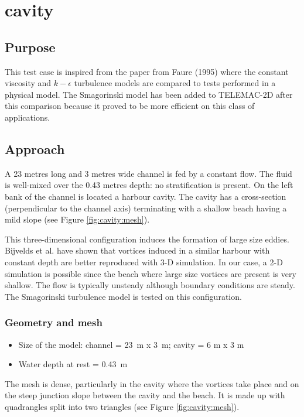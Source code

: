 \chapter{cavity}

\section{Purpose}
This test case is inspired from the paper from Faure (1995)
\cite{Faure1995}where the constant viscosity and $k-\epsilon$ turbulence models
are compared to tests performed in a physical model. The Smagorinski model has
been added to TELEMAC-2D after this comparison because it proved to be more
efficient on this class of applications.

\section{Approach}
A 23 metres long and 3 metres wide channel is fed by a constant flow. The fluid
is well-mixed over the 0.43 metres depth: no stratification is present. On the
left bank of the channel is located a harbour cavity. The cavity has a
cross-section (perpendicular to the channel axis) terminating with a shallow
beach having a mild slope (see Figure \ref{fig:cavity:mesh}).

This three-dimensional configuration induces the formation of large size
eddies. Bijvelds et al. \cite{Bijvelds1997} have shown that vortices induced in
a similar harbour with constant depth are better reproduced with 3-D
simulation. In our case, a 2-D simulation is possible since the beach where
large size vortices are present is very shallow. The flow is typically unsteady
although boundary conditions are steady. The Smagorinski turbulence model is
tested on this configuration.

\subsection{Geometry and mesh}

\begin{itemize}
\item Size of the model: channel = 23 m x 3 m; cavity = 6 m x 3 m
\item Water depth at rest = 0.43 m
\end{itemize}

The mesh is dense, particularly in the cavity where the vortices take place and
on the steep junction slope between the cavity and the beach. It is made up
with quadrangles split into two triangles (see Figure \ref{fig:cavity:mesh}).

